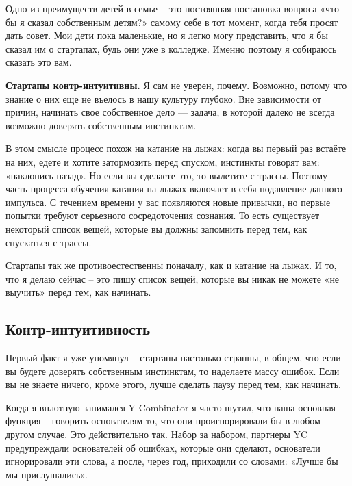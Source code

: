\documentclass[ebook,12pt,oneside,openany]{memoir}
\begin{document}
\maketitle

Одно из преимуществ детей в семье – это постоянная постановка вопроса
«что бы я сказал собственным детям?» самому себе в тот момент, когда
тебя просят дать совет. Мои дети пока маленькие, но я легко могу
представить, что я бы сказал им о стартапах, будь они уже в колледже.
Именно поэтому я собираюсь сказать это вам. \newline

\textbf{Стартапы контр-интуитивны.} Я сам не уверен, почему. Возможно, потому
что знание о них еще не въелось в нашу культуру глубоко. Вне
зависимости от причин, начинать свое собственное дело — задача, в
которой далеко не всегда возможно доверять собственным инстинктам. \newline

В этом смысле процесс похож на катание на лыжах: когда вы первый раз
встаёте на них, едете и хотите затормозить перед спуском, инстинкты
говорят вам: «наклонись назад». Но если вы сделаете это, то вылетите с
трассы. Поэтому часть процесса обучения катания на лыжах включает в
себя подавление данного импульса. С течением времени у вас появляются
новые привычки, но первые попытки требуют серьезного сосредоточения
сознания. То есть существует некоторый список вещей, которые вы должны
запомнить перед тем, как спускаться с трассы. \newline

Стартапы так же противоестественны поначалу, как и катание на лыжах. И
то, что я делаю сейчас – это пишу список вещей, которые вы никак не
можете «не выучить» перед тем, как начинать. \newline

\subsection{Контр-интуитивность}

Первый факт я уже упомянул – стартапы настолько странны, в общем, что
если вы будете доверять собственным инстинктам, то наделаете массу
ошибок. Если вы не знаете ничего, кроме этого, лучше сделать паузу
перед тем, как начинать. \newline

Когда я вплотную занимался Y Combinator я часто шутил, что наша
основная функция – говорить основателям то, что они проигнорировали бы
в любом другом случае. Это действительно так. Набор за набором,
партнеры YC предупреждали основателей об ошибках, которые они сделают,
основатели игнорировали эти слова, а после, через год, приходили со
словами: «Лучше бы мы прислушались». \newline
\end{document}

